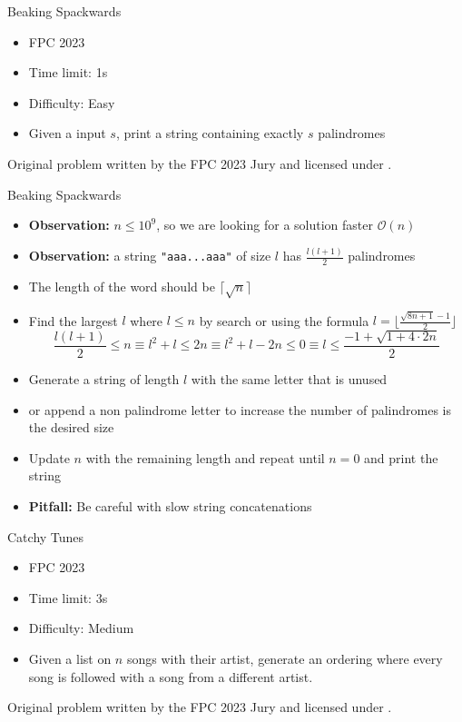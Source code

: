 \documentclass[11pt,pdf, aspectratio=169]{beamer}
\begin{document}
  \begin{frame}{Beaking Spackwards}
    \begin{itemize}
      \item FPC 2023
      \item Time limit: 1s
      \item Difficulty: Easy
      \item Given a input $s$, print a string containing exactly $s$ palindromes
    \end{itemize}
    Original problem written by the FPC 2023 Jury and licensed under \doclicenseLongNameRef.

    \doclicenseImage

  \end{frame}
  \begin{frame}{Beaking Spackwards}
    \begin{itemize}
      \item<1-> \textbf{Observation:} $n \leq 10^9$, so we are looking for a solution faster $\mathcal{O}(n)$
      \item<2-> \textbf{Observation:} a string \texttt{"aaa...aaa"} of size $l$ has $\frac{l(l+1)}{2}$ palindromes
      \item<3-> The length of the word should be $\lceil\sqrt{n}\rceil$
      \item<4-> Find the largest $l$ where $l \leq n$ by search or using the formula $l = \lfloor\frac{\sqrt {8n + 1}-1}{2}\rfloor$\\\[
                                                                                                                                       \frac{l(l+1)}{2}\leq n \equiv l^2+l \leq 2n \equiv l^2+l-2n \leq 0 \equiv l \leq \frac{-1 + \sqrt {1+4\cdot 2n}}{2}\]
      \item<5-> Generate a string of length $l$ with the same letter that is unused
      \item<5-> or append a non palindrome letter to increase the number of palindromes is the desired size
      \item<5-> Update $n$ with the remaining length and repeat until $n=0$ and print the string
      \item<6-> \textbf{Pitfall:} Be careful with slow string concatenations
    \end{itemize}
  \end{frame}
  \begin{frame}{Catchy Tunes}
    \begin{itemize}
      \item FPC 2023
      \item Time limit: 3s
      \item Difficulty: Medium
      \item Given a list on $n$ songs with their artist, generate an ordering where every song is followed with a song from a different artist.
    \end{itemize}
    Original problem written by the FPC 2023 Jury and licensed under \doclicenseLongNameRef.

    \doclicenseImage

  \end{frame}
\end{document}
